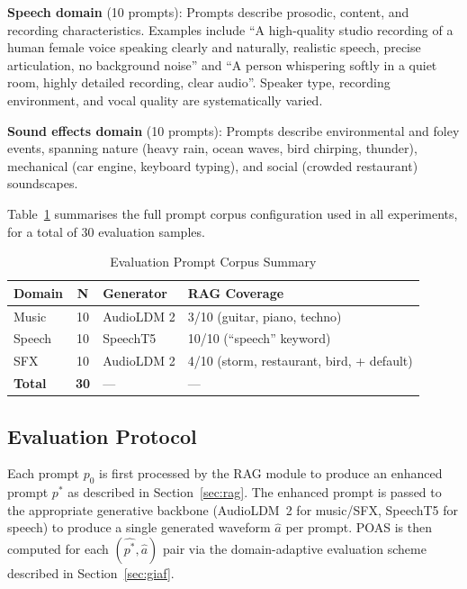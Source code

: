 \documentclass[journal]{IEEEtran}
\begin{document}
\noindent\textbf{Speech domain} (10 prompts): Prompts describe prosodic,
content, and recording characteristics. Examples include ``A
high-quality studio recording of a human female voice speaking clearly
and naturally, realistic speech, precise articulation, no background
noise'' and ``A person whispering softly in a quiet room, highly
detailed recording, clear audio''. Speaker type, recording environment,
and vocal quality are systematically varied.

\noindent\textbf{Sound effects domain} (10 prompts): Prompts describe
environmental and foley events, spanning nature (heavy rain, ocean
waves, bird chirping, thunder), mechanical (car engine, keyboard
typing), and social (crowded restaurant) soundscapes.

Table~\ref{tab:dataset} summarises the full prompt corpus
configuration used in all experiments, for a total of 30 evaluation
samples.

\begin{table}[!t]
  \renewcommand{\arraystretch}{1.3}
  \caption{Evaluation Prompt Corpus Summary}
  \label{tab:dataset}
  \centering
  \begin{tabular}{|l|c|l|l|}
  \hline
  \textbf{Domain} & \textbf{N} & \textbf{Generator} & \textbf{RAG Coverage} \\
  \hline
  Music   & 10 & AudioLDM 2 & 3/10 (guitar, piano, techno) \\
  Speech  & 10 & SpeechT5   & 10/10 (``speech'' keyword)  \\
  SFX     & 10 & AudioLDM 2 & 4/10 (storm, restaurant, bird, + default) \\
  \hline
  \textbf{Total} & \textbf{30} & --- & --- \\
  \hline
  \end{tabular}
\end{table}

\subsection{Evaluation Protocol}

Each prompt $p_0$ is first processed by the RAG module to produce an
enhanced prompt $p^*$ as described in Section~\ref{sec:rag}. The
enhanced prompt is passed to the appropriate generative backbone
(AudioLDM~2 for music/SFX, SpeechT5 for speech) to produce a single
generated waveform $\hat{a}$ per prompt. POAS is then computed for
each $(\hat{p^*}, \hat{a})$ pair via the domain-adaptive evaluation
scheme described in Section~\ref{sec:giaf}.
\end{document}
